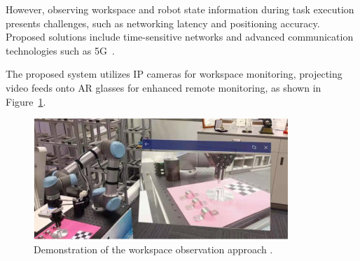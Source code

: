 However, observing workspace and robot state information during task execution presents challenges, such as networking latency and positioning accuracy. Proposed solutions include time-sensitive networks and advanced communication technologies such as 5G~\cite{LI2022102321}.

The proposed system utilizes IP cameras for workspace monitoring, projecting video feeds onto \ac{AR} glasses for enhanced remote monitoring, as shown in Figure~\ref{f:workspace-visualization}.

\begin{figure}[!htpb]
    \centering
    \includegraphics[width=0.7\linewidth]{figs/workspace-visualization.jpg}
    \caption{Demonstration of the workspace observation approach \cite{LI2022102321}.}
    \label{f:workspace-visualization}
\end{figure}
\FloatBarrier




